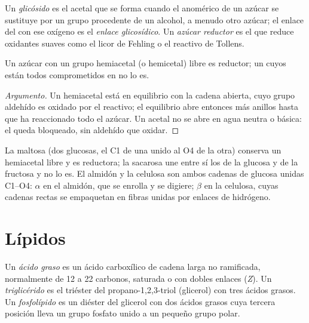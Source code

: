 \begin{definition}[Glicósidos]\label{def:b2:biomolecules:glycoside}
Un \emph{glicósido} es el acetal que se forma cuando el  anomérico de un azúcar se sustituye
por un grupo  procedente de un alcohol, a menudo otro azúcar; el enlace del  con ese
oxígeno es el \emph{enlace glicosídico}. Un \emph{azúcar reductor}
es el que reduce oxidantes suaves como el licor de Fehling o el reactivo de Tollens.
\end{definition}

\begin{proposition}[Reductor o no]\label{prop:b2:biomolecules:reducing}
Un azúcar con un grupo hemiacetal (o hemicetal) libre es reductor; un  cuyos  están
todos comprometidos en  no lo es.
\end{proposition}

\begin{proof}[Argumento]
Un hemiacetal está en equilibrio con la cadena abierta, cuyo grupo aldehído es oxidado por el reactivo;
el equilibrio abre entonces más anillos hasta que ha reaccionado todo el azúcar. Un acetal no se abre en
agua neutra o básica: el  queda bloqueado, sin aldehído que oxidar.
\end{proof}

La maltosa (dos glucosas, el C1 de una unido al O4 de la otra) conserva un hemiacetal libre y es reductora;
la sacarosa une entre sí los  de la glucosa y de la fructosa y no lo es. El almidón y la
celulosa son ambos cadenas de glucosa unidas C1--O4: $\alpha$ en el almidón, que se enrolla y se digiere;
$\beta$ en la celulosa, cuyas cadenas rectas se empaquetan en fibras unidas por enlaces de hidrógeno.

\section{Lípidos}

\begin{definition}[Lípidos]\label{def:b2:biomolecules:lipid}
Un \emph{ácido graso} es un ácido carboxílico de cadena larga no ramificada, normalmente de 12 a
22 carbonos, saturada o con dobles enlaces (\textit{Z}). Un \emph{triglicérido} es el
triéster del propano-1,2,3-triol (glicerol) con tres ácidos grasos. Un
\emph{fosfolípido} es un diéster del glicerol con dos ácidos grasos cuya tercera
posición lleva un grupo fosfato unido a un pequeño grupo polar.
\end{definition}

